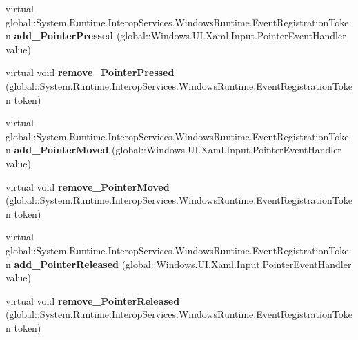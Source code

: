 \begin{DoxyCompactItemize}
\item 
\mbox{\label{class_windows_1_1_u_i_1_1_xaml_1_1_u_i_element_a06d0eec496772934d5bfec139854c34c}} 
virtual global\+::\+System.\+Runtime.\+Interop\+Services.\+Windows\+Runtime.\+Event\+Registration\+Token {\bfseries add\+\_\+\+Pointer\+Pressed} (global\+::\+Windows.\+U\+I.\+Xaml.\+Input.\+Pointer\+Event\+Handler value)
\item 
\mbox{\label{class_windows_1_1_u_i_1_1_xaml_1_1_u_i_element_a4e21b0597f1640b1294e0dc5d330e6ca}} 
virtual void {\bfseries remove\+\_\+\+Pointer\+Pressed} (global\+::\+System.\+Runtime.\+Interop\+Services.\+Windows\+Runtime.\+Event\+Registration\+Token token)
\item 
\mbox{\label{class_windows_1_1_u_i_1_1_xaml_1_1_u_i_element_a35fdbc426595a77556b9e7587b4c8f8e}} 
virtual global\+::\+System.\+Runtime.\+Interop\+Services.\+Windows\+Runtime.\+Event\+Registration\+Token {\bfseries add\+\_\+\+Pointer\+Moved} (global\+::\+Windows.\+U\+I.\+Xaml.\+Input.\+Pointer\+Event\+Handler value)
\item 
\mbox{\label{class_windows_1_1_u_i_1_1_xaml_1_1_u_i_element_a63a39b75c65106c0b053b29fc0637f66}} 
virtual void {\bfseries remove\+\_\+\+Pointer\+Moved} (global\+::\+System.\+Runtime.\+Interop\+Services.\+Windows\+Runtime.\+Event\+Registration\+Token token)
\item 
\mbox{\label{class_windows_1_1_u_i_1_1_xaml_1_1_u_i_element_ac262b01e4394eafebb2fc7c72a05c364}} 
virtual global\+::\+System.\+Runtime.\+Interop\+Services.\+Windows\+Runtime.\+Event\+Registration\+Token {\bfseries add\+\_\+\+Pointer\+Released} (global\+::\+Windows.\+U\+I.\+Xaml.\+Input.\+Pointer\+Event\+Handler value)
\item 
\mbox{\label{class_windows_1_1_u_i_1_1_xaml_1_1_u_i_element_a6b1fe59db3a3dade2439c90e7005d059}} 
virtual void {\bfseries remove\+\_\+\+Pointer\+Released} (global\+::\+System.\+Runtime.\+Interop\+Services.\+Windows\+Runtime.\+Event\+Registration\+Token token)
\item 

\end{DoxyCompactItemize}
